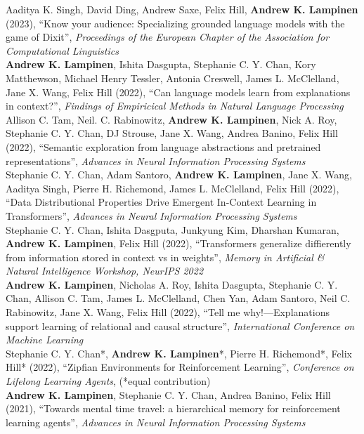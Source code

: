 \documentclass[margin]{res}
\begin{document}
\begin{resume}
Aaditya K. Singh, David Ding, Andrew Saxe, Felix Hill, \textbf{Andrew K. Lampinen} (2023), {``Know your audience: Specializing grounded language models with the game of Dixit'',} \textit{Proceedings of the European Chapter of the Association for Computational Linguistics} \\[3pt]
\textbf{Andrew K. Lampinen}, Ishita Dasgupta, Stephanie C. Y. Chan, Kory Matthewson, Michael Henry Tessler, Antonia Creswell, James L. McClelland, Jane X. Wang, Felix Hill (2022), {``Can language models learn from explanations in context?'',} \textit{Findings of Empiricical Methods in Natural Language Processing} \\[3pt] 
Allison C. Tam,  Neil. C. Rabinowitz, \textbf{Andrew K. Lampinen}, Nick A. Roy, Stephanie C. Y. Chan, DJ Strouse, Jane X. Wang, Andrea Banino, Felix Hill (2022), {``Semantic exploration from language abstractions and pretrained representations'',} \textit{Advances in Neural Information Processing Systems} \\[3pt] 
Stephanie C. Y. Chan, Adam Santoro, \textbf{Andrew K. Lampinen}, Jane X. Wang, Aaditya Singh, Pierre H. Richemond, James L. McClelland, Felix Hill (2022), {``Data Distributional Properties Drive Emergent In-Context Learning in Transformers'',} \textit{Advances in Neural Information Processing Systems} \\[3pt] 
Stephanie C. Y. Chan, Ishita Dasgputa, Junkyung Kim, Dharshan Kumaran, \textbf{Andrew K. Lampinen}, Felix Hill (2022), {``Transformers generalize diffierently from information stored in context vs in weights'',} \textit{Memory in Artificial \& Natural Intelligence Workshop, NeurIPS 2022} \\[3pt]
\textbf{Andrew K. Lampinen}, Nicholas A. Roy, Ishita Dasgupta, Stephanie C. Y. Chan, Allison C. Tam, James L. McClelland, Chen Yan, Adam Santoro, Neil C. Rabinowitz, Jane X. Wang, Felix Hill (2022), {``Tell me why!---Explanations support learning of relational and causal structure'',} \textit{International Conference on Machine Learning} \\[3pt] 
Stephanie C. Y. Chan*, \textbf{Andrew K. Lampinen}*, Pierre H. Richemond*, Felix Hill* (2022), {``Zipfian Environments for Reinforcement Learning'',} \textit{Conference on Lifelong Learning Agents}, (*equal contribution) \\[3pt] 
\textbf{Andrew K. Lampinen}, Stephanie C. Y. Chan, Andrea Banino, Felix Hill (2021), {``Towards mental time travel: a hierarchical memory for reinforcement learning agents'',} \textit{Advances in Neural Information Processing Systems} \\[3pt] 

\end{resume}
\end{document}
